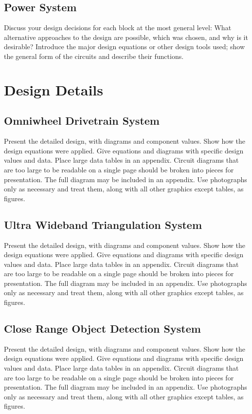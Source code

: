 \documentclass{report}
\begin{document}
    \subsection{Power System}
    Discuss your design decisions for each block at the most general level: What alternative approaches to the design are possible, which was chosen, and why is it desirable? Introduce the major design equations or other design tools used; show the general form of the circuits and describe their functions.

    \section{Design Details}

    \subsection{Omniwheel Drivetrain System}
    Present the detailed design, with diagrams and component values. Show how the design equations were applied. Give equations and diagrams with specific design values and data. Place large data tables in an appendix. Circuit diagrams that are too large to be readable on a single page should be broken into pieces for presentation. The full diagram may be included in an appendix. Use photographs only as necessary and treat them, along with all other graphics except tables, as figures.

    \subsection{Ultra Wideband Triangulation System}
    Present the detailed design, with diagrams and component values. Show how the design equations were applied. Give equations and diagrams with specific design values and data. Place large data tables in an appendix. Circuit diagrams that are too large to be readable on a single page should be broken into pieces for presentation. The full diagram may be included in an appendix. Use photographs only as necessary and treat them, along with all other graphics except tables, as figures.

    \subsection{Close Range Object Detection System}
    Present the detailed design, with diagrams and component values. Show how the design equations were applied. Give equations and diagrams with specific design values and data. Place large data tables in an appendix. Circuit diagrams that are too large to be readable on a single page should be broken into pieces for presentation. The full diagram may be included in an appendix. Use photographs only as necessary and treat them, along with all other graphics except tables, as figures.
\end{document}
